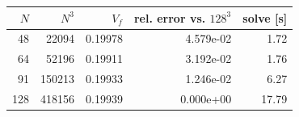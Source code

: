 \begin{tabular}{rrrrr}
\toprule
$N$ & $N^3$ & $V_f$ & rel. error vs. $128^3$ & solve [s] \\
\midrule
48 & 22094 & 0.19978 & 4.579e-02 & 1.72 \\
64 & 52196 & 0.19911 & 3.192e-02 & 1.76 \\
91 & 150213 & 0.19933 & 1.246e-02 & 6.27 \\
128 & 418156 & 0.19939 & 0.000e+00 & 17.79 \\
\bottomrule
\end{tabular}
